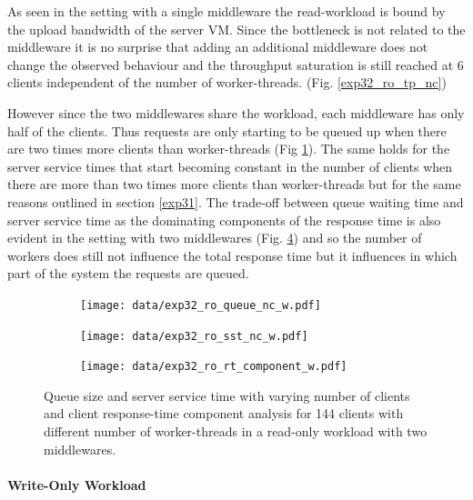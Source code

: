 \documentclass[11pt,a4paper]{article}
\begin{document}
As seen in the setting with a single middleware the read-workload is bound by the upload bandwidth of the server VM. Since the bottleneck is not related to the middleware it is no surprise that adding an additional middleware does not change the observed behaviour and the throughput saturation is still reached at 6 clients independent of the number of worker-threads. (Fig. \ref{exp32_ro_tp_nc})

However since the two middlewares share the workload, each middleware has only half of the clients.
Thus requests are only starting to be queued up when there are two times more clients than worker-threads (Fig \ref{exp32_ro_q}).
The same holds for the server service times that start becoming constant in the number of clients when there are more than two times more clients than worker-threads but for the same reasons outlined in section \ref{exp31}. 
The trade-off between queue waiting time and server service time as the dominating components of the response time is also evident in the setting with two middlewares (Fig. \ref{exp32_ro_rtcomp}) and so the number of workers does still not influence the total response time but it influences in which part of the system the requests are queued.



\begin{figure}
	\begin{subfigure}[b]{.33\linewidth}
		\centering
		\texttt{[image: data/exp32\_ro\_queue\_nc\_w.pdf]}
		\caption{}\label{exp32_ro_q}
	\end{subfigure}\hfill
	\begin{subfigure}[b]{.33\linewidth}
		\centering
		\texttt{[image: data/exp32\_ro\_sst\_nc\_w.pdf]}
		\caption{}\label{exp32_ro_sst}
	\end{subfigure}\hfill
	\begin{subfigure}[b]{.33\linewidth}
		\centering
		\texttt{[image: data/exp32\_ro\_rt\_component\_w.pdf]}
		\caption{}\label{exp32_ro_rtcomp}
	\end{subfigure}
	\caption{Queue size and server service time with varying number of clients and client response-time component analysis for 144 clients with different number of worker-threads in a read-only workload with two middlewares.}
\end{figure}

\paragraph{Write-Only Workload}
\end{document}
